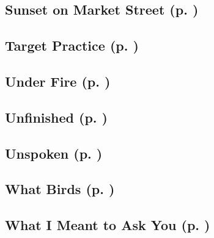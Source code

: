 \subsection*{Sunset on Market Street (p. \pageref{ch:sunset_on_market_street})}
\subsection*{Target Practice (p. \pageref{ch:target_practice})}
\subsection*{Under Fire  (p. \pageref{ch:under_fire})}
\subsection*{Unfinished (p. \pageref{ch:unfinished})}
\subsection*{Unspoken (p. \pageref{ch:unspoken})}
\subsection*{What Birds (p. \pageref{ch:what_birds})}
\subsection*{What I Meant to Ask You (p. \pageref{ch:what_i_meant_to_ask})}